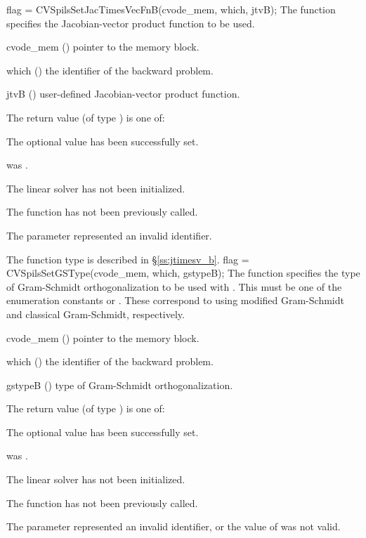 {
  flag = CVSpilsSetJacTimesVecFnB(cvode\_mem, which, jtvB);
}
{
  The function  specifies the Jacobian-vector 
  product function to be used.
}
{
  \begin{args}
  \item[cvode\_mem] ()
    pointer to the {\cvodes} memory block.
  \item[which] ()
    the identifier of the backward problem.
  \item[jtvB] ()
    user-defined Jacobian-vector product function.
  \end{args}
}
{
  The return value  (of type ) is one of:
  \begin{args}
  \item[\Id{CVSPILS\_SUCCESS}] 
    The optional value has been successfully set.
  \item[\Id{CVSPILS\_MEM\_NULL}]
     was .
  \item[\Id{CVSPILS\_LMEM\_NULL}]
    The {\cvspils} linear solver has not been initialized.
  \item[\Id{CVSPILS\_NO\_ADJ}]
    The function  has not been previously called.
  \item[\Id{CVSPILS\_ILL\_INPUT}]
    The parameter  represented an invalid identifier.
  \end{args}
}
{
  The function type  is described in \S\ref{ss:jtimesv_b}.
}
{
  flag = CVSpilsSetGSType(cvode\_mem, which, gstypeB);
}
{
  The function  specifies the type of
  Gram-Schmidt orthogonalization to be used with {\cvspgmr}.
  This must be one of the enumeration constants 
  or . These correspond to using modified Gram-Schmidt 
  and classical Gram-Schmidt, respectively. 
}
{
  \begin{args}[gstypeB]
  \item[cvode\_mem] ()
    pointer to the {\cvodes} memory block.
  \item[which] ()
    the identifier of the backward problem.
  \item[gstypeB] ()
    type of Gram-Schmidt orthogonalization.
  \end{args}
}
{
  The return value  (of type ) is one of:
  \begin{args}
  \item[\Id{CVSPILS\_SUCCESS}] 
    The optional value has been successfully set.
  \item[\Id{CVSPILS\_MEM\_NULL}]
     was .
  \item[\Id{CVSPILS\_LMEM\_NULL}]
    The {\cvspils} linear solver has not been initialized.
  \item[\Id{CVSPILS\_NO\_ADJ}]
    The function  has not been previously called.
  \item[\Id{CVSPILS\_ILL\_INPUT}]
    The parameter  represented an invalid identifier, or the 
    value of  was not valid.
  \end{args}
}
